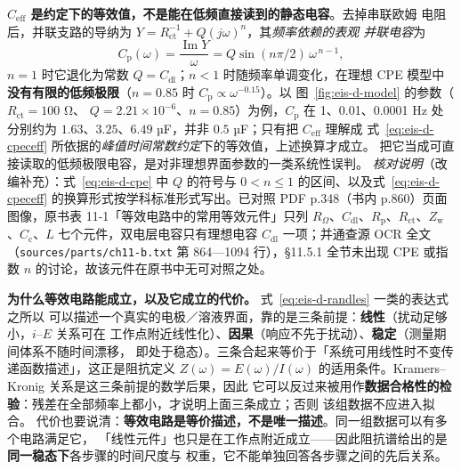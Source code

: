 \textbf{$C_{\mathrm{eff}}$ 是约定下的等效值，不是能在低频直接读到的静态电容}。去掉串联欧姆
电阻后，并联支路的导纳为 $Y=R_{\mathrm{ct}}^{-1}+Q(j\omega)^{n}$，其\emph{频率依赖的表观
并联电容}为
\begin{equation}
C_{\mathrm{p}}(\omega)=\frac{\operatorname{Im}Y}{\omega}
=Q\sin(n\pi/2)\,\omega^{\,n-1},
\label{eq:eis-d-cpapp}
\end{equation}
$n=1$ 时它退化为常数 $Q=C_{\mathrm{dl}}$；$n<1$ 时随频率单调变化，在理想 CPE 模型中
\textbf{没有有限的低频极限}（$n=0.85$ 时 $C_{\mathrm{p}}\propto\omega^{-0.15}$）。以
图~\ref{fig:eis-d-model} 的参数（$R_{\mathrm{ct}}=100$ \unit{\ohm}、
$Q=2.21\times10^{-6}$、$n=0.85$）为例，$C_{\mathrm{p}}$ 在 1、0.01、0.0001 Hz 处分别约为
$1.63$、$3.25$、$6.49$ µF，并非 $0.5$ µF；只有把 $C_{\mathrm{eff}}$ 理解成
式~\eqref{eq:eis-d-cpeceff} 所依据的\emph{峰值时间常数约定}下的等效值，上述换算才成立。
把它当成可直接读取的低频极限电容，是对非理想界面参数的一类系统性误判。
\emph{核对说明}（改编补充）：式~\eqref{eq:eis-d-cpe} 中 $Q$ 的符号与 $0<n\le1$ 的区间、以及式~\eqref{eq:eis-d-cpeceff} 的换算形式按学科标准形式写出。已对照 PDF p.348（书内 p.860）页面图像，原书表 11-1「等效电路中的常用等效元件」只列 $R_\Omega$、$C_{\mathrm{dl}}$、$R_{\mathrm{p}}$、$R_{\mathrm{ct}}$、$Z_{\mathrm{w}}$、$C_{\mathrm{c}}$、$L$ 七个元件，双电层电容只有理想电容 $C_{\mathrm{dl}}$ 一项；并通查源 OCR 全文（\texttt{sources/parts/ch11-b.txt} 第 864—1094 行），§11.5.1 全节未出现 CPE 或指数 $n$ 的讨论，故该元件在原书中无可对照之处。

\begin{principle}
\textbf{为什么等效电路能成立，以及它成立的代价。} 式~\eqref{eq:eis-d-randles} 一类的表达式之所以
可以描述一个真实的电极／溶液界面，靠的是三条前提：\textbf{线性}（扰动足够小，$i$–$E$ 关系可在
工作点附近线性化）、\textbf{因果}（响应不先于扰动）、\textbf{稳定}（测量期间体系不随时间漂移，
即处于稳态）。三条合起来等价于「系统可用线性时不变传递函数描述」，这正是阻抗定义
$Z(\omega)=E(\omega)/I(\omega)$ 的适用条件。Kramers--Kronig 关系是这三条前提的数学后果，因此
它可以反过来被用作\textbf{数据合格性的检验}：残差在全部频率上都小，才说明上面三条成立；否则
该组数据不应进入拟合。
代价也要说清：\textbf{等效电路是等价描述，不是唯一描述}。同一组数据可以有多个电路满足它，
「线性元件」也只是在工作点附近成立——因此阻抗谱给出的是\textbf{同一稳态下}各步骤的时间尺度与
权重，它不能单独回答各步骤之间的先后关系。
\end{principle}

